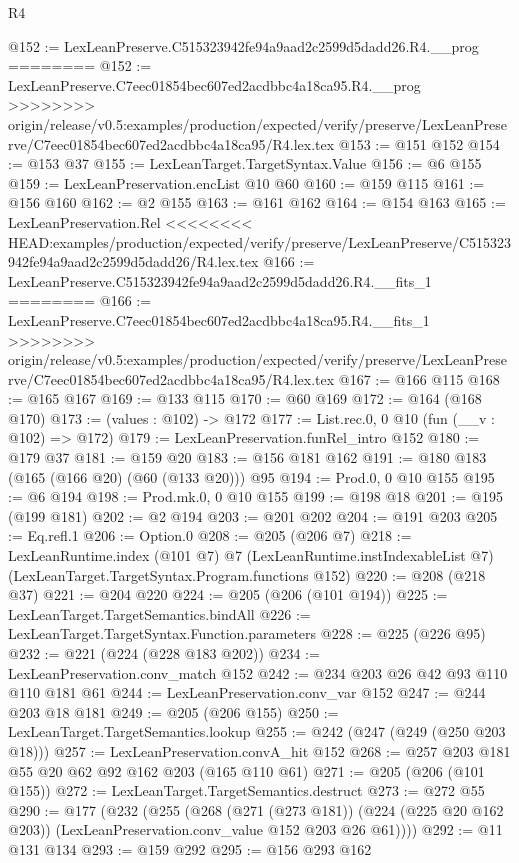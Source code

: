 \begin{lexlean}{R4}
\begin{coremodule}
{{{{{{{{@152 := LexLeanPreserve.C515323942fe94a9aad2c2599d5dadd26.R4.__prog
========
@152 := LexLeanPreserve.C7eec01854bec607ed2acdbbc4a18ca95.R4.__prog
>>>>>>>> origin/release/v0.5:examples/production/expected/verify/preserve/LexLeanPreserve/C7eec01854bec607ed2acdbbc4a18ca95/R4.lex.tex
@153 := @151 @152
@154 := @153 @37
@155 := LexLeanTarget.TargetSyntax.Value
@156 := @6 @155
@159 := LexLeanPreservation.encList @10 @60
@160 := @159 @115
@161 := @156 @160
@162 := @2 @155
@163 := @161 @162
@164 := @154 @163
@165 := LexLeanPreservation.Rel
<<<<<<<< HEAD:examples/production/expected/verify/preserve/LexLeanPreserve/C515323942fe94a9aad2c2599d5dadd26/R4.lex.tex
@166 := LexLeanPreserve.C515323942fe94a9aad2c2599d5dadd26.R4.__fits_1
========
@166 := LexLeanPreserve.C7eec01854bec607ed2acdbbc4a18ca95.R4.__fits_1
>>>>>>>> origin/release/v0.5:examples/production/expected/verify/preserve/LexLeanPreserve/C7eec01854bec607ed2acdbbc4a18ca95/R4.lex.tex
@167 := @166 @115
@168 := @165 @167
@169 := @133 @115
@170 := @60 @169
@172 := @164 (@168 @170)
@173 := (values : @102) -> @172
@177 := List.rec.{0, 0} @10 (fun (__v : @102) => @172)
@179 := LexLeanPreservation.funRel_intro @152
@180 := @179 @37
@181 := @159 @20
@183 := @156 @181 @162
@191 := @180 @183 (@165 (@166 @20) (@60 (@133 @20))) @95
@194 := Prod.{0, 0} @10 @155
@195 := @6 @194
@198 := Prod.mk.{0, 0} @10 @155
@199 := @198 @18
@201 := @195 (@199 @181)
@202 := @2 @194
@203 := @201 @202
@204 := @191 @203
@205 := Eq.refl.{1}
@206 := Option.{0}
@208 := @205 (@206 @7)
@218 := LexLeanRuntime.index
    (@101 @7)
    @7
    (LexLeanRuntime.instIndexableList @7)
    (LexLeanTarget.TargetSyntax.Program.functions @152)
@220 := @208 (@218 @37)
@221 := @204 @220
@224 := @205 (@206 (@101 @194))
@225 := LexLeanTarget.TargetSemantics.bindAll
@226 := LexLeanTarget.TargetSyntax.Function.parameters
@228 := @225 (@226 @95)
@232 := @221 (@224 (@228 @183 @202))
@234 := LexLeanPreservation.conv_match @152
@242 := @234 @203 @26 @42 @93 @110 @110 @181 @61
@244 := LexLeanPreservation.conv_var @152
@247 := @244 @203 @18 @181
@249 := @205 (@206 @155)
@250 := LexLeanTarget.TargetSemantics.lookup
@255 := @242 (@247 (@249 (@250 @203 @18)))
@257 := LexLeanPreservation.convA_hit @152
@268 := @257 @203 @181 @55 @20 @62 @92 @162 @203 (@165 @110 @61)
@271 := @205 (@206 (@101 @155))
@272 := LexLeanTarget.TargetSemantics.destruct
@273 := @272 @55
@290 := @177
    (@232
      (@255
        (@268
          (@271 (@273 @181))
          (@224 (@225 @20 @162 @203))
          (LexLeanPreservation.conv_value @152 @203 @26 @61))))
@292 := @11 @131 @134
@293 := @159 @292
@295 := @156 @293 @162
}}}}}}}}
\end{coremodule}
\end{lexlean}
